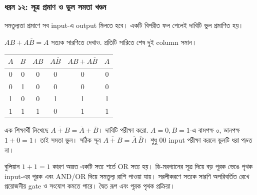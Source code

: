 \subsubsection*{ধরন ১২: সূত্র প্রমাণ ও ভুল সমতা খণ্ডন}
সমতুল্যতা প্রমাণে সব input-এ output মিলতে হবে। একটি বিপরীত ফল পেলেই দাবিটি ভুল প্রমাণিত হয়।
\par\smallskip\noindent\begin{minipage}{\linewidth}
$AB+A\overline B=A$ সত্যক সারণিতে দেখাও.
\chThreeAnswer প্রতিটি সারিতে শেষ দুই column সমান।
\begin{center}\begin{tabular}{|c|c|c|c|c|c|}\hline
$A$ & $B$ & $AB$ & $A\overline B$ & $AB+A\overline B$ & $A$\\\hline
0 & 0 & 0 & 0 & 0 & 0\\\hline
0 & 1 & 0 & 0 & 0 & 0\\\hline
1 & 0 & 0 & 1 & 1 & 1\\\hline
1 & 1 & 1 & 0 & 1 & 1\\\hline
\end{tabular}\end{center}

\end{minipage}\par\smallskip
\par\smallskip\noindent\begin{minipage}{\linewidth}
এক শিক্ষার্থী লিখেছে $\overline{A+B}=\overline A+\overline B$। দাবিটি পরীক্ষা করো.
\chThreeAnswer $A=0,B=1$-এ বামপক্ষ ০, ডানপক্ষ $1+0=1$। তাই সমতা ভুল। সঠিক সূত্র $\overline{A+B}=\overline A\,\overline B$। শুধু 00 input পরীক্ষা করলে ভুলটি ধরা পড়ত না।

\end{minipage}\par\smallskip
{}
বুলিয়ান $1+1=1$ কারণ অন্তত একটি সত্য শর্তে OR সত্য হয়। ডি-মরগ্যানের সূত্র দিয়ে বড় পূরক ভেঙে পৃথক input-এর পূরক এবং AND/OR দিয়ে সমতুল্য রাশি পাওয়া যায়। সরলীকরণে সত্যক সারণি অপরিবর্তিত রেখে প্রয়োজনীয় gate ও সংযোগ কমতে পারে। দ্বৈত রূপ এবং পূরক পৃথক প্রক্রিয়া।
